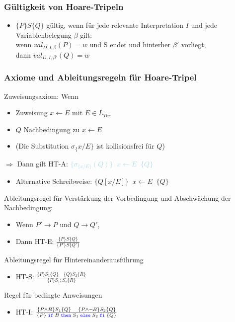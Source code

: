 \documentclass{article}
\newcommand{\blue}[1]{\textcolor{blue}{#1}}
\newcommand{\babyblue}[1]{\textcolor{lightblue}{#1}}
\newcommand{\important}[1]{\textcolor{importantColor}{#1}}
\newcommand{\word}[1]{\blue{\texttt{#1}}}
\newcommand{\interpretation}[1]{\babyblue{#1}}
\newcommand{\set}[1]{\{#1\}}
\begin{document}
\subsubsection{Gültigkeit von Hoare-Tripeln}
\begin{itemize}
    \item $\set{P}S\set{Q}$ \important{gültig}, wenn für jede relevante Interpretation $I$ und jede Variablenbelegung $\beta$ gilt:\\
    wenn \important{$val_{D,I,\beta }(P)=w$} und S endet und hinterher $\beta'$ vorliegt,\\
    dann \important{$val_{D,I,\beta'}(Q)=w$}
\end{itemize}

\subsubsection{Axiome und Ableitungsregeln für Hoare-Tripel}
\important{Zuweisungsaxiom}: Wenn
\begin{itemize}
    \item Zuweisung $x\leftarrow E$ mit $E\in L_{Ter}$
    \item $Q$ Nachbedingung zu $x\leftarrow E$
    \item (Die Substitution $\sigma_\set{{x/E}}$ ist kollisionsfrei für $Q$)
\end{itemize}
$\Rightarrow$ Dann gilt \important{HT-A}: \interpretation{$\set{\sigma_{\set{x/E}}(Q)}\;\; x \leftarrow E \;\;\set{Q}$}
\begin{itemize}
    \item Alternative Schreibweise: $\set{Q[x/E]} \;\; x \leftarrow E \;\; \set{Q}$
\end{itemize}
Ableitungsregel für \important{Verstärkung der Vorbedingung} und \important{Abschwächung der Nachbedingung}:
\begin{itemize}
    \item Wenn $P' \rightarrow P$ und $Q \rightarrow Q'$,
    \item Dann \important{HT-E}: $\frac{\set{P}S\set{Q}}{\set{P'}S\set{Q'}}$
\end{itemize}

Ableitungsregel für \important{Hintereinanderausführung}
\begin{itemize}
    \item \important{HT-S}: $\frac{\set{P}S_1\set{Q} \quad \set{Q}S_2\set{R}}{\set{P}S_1;S_2\set{R}}$
\end{itemize}

Regel für \important{bedingte Anweisungen}
\begin{itemize}
    \item \important{HT-I}: $\frac{\set{P \land B}S_1\set{Q} \quad \set{P \land\lnot B}S_2\set{Q}}{\set{P}\; \word{if}\; B\; \word{then}\; S_1\; \word{else}\; S_2\; \word{fi}\; \set{Q}}$
\end{itemize}
\end{document}
